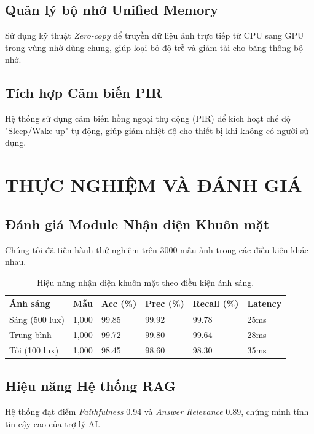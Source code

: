 \documentclass[12pt,a4paper]{article}
\begin{document}
\subsection{Quản lý bộ nhớ Unified Memory}
Sử dụng kỹ thuật \textit{Zero-copy} để truyền dữ liệu ảnh trực tiếp từ CPU sang GPU trong vùng nhớ dùng chung, giúp loại bỏ độ trễ và giảm tải cho băng thông bộ nhớ.

\subsection{Tích hợp Cảm biến PIR}
Hệ thống sử dụng cảm biến hồng ngoại thụ động (PIR) để kích hoạt chế độ "Sleep/Wake-up" tự động, giúp giảm nhiệt độ cho thiết bị khi không có người sử dụng.

\section{THỰC NGHIỆM VÀ ĐÁNH GIÁ}

\subsection{Đánh giá Module Nhận diện Khuôn mặt}
Chúng tôi đã tiến hành thử nghiệm trên 3000 mẫu ảnh trong các điều kiện khác nhau.

\begin{table}[H]
    \centering
    \caption{Hiệu năng nhận diện khuôn mặt theo điều kiện ánh sáng.}
    \begin{tabularx}{\textwidth}{lXXXXX}
        \toprule
        \textbf{Ánh sáng} & \textbf{Mẫu} & \textbf{Acc (\%)} & \textbf{Prec (\%)} & \textbf{Recall (\%)} & \textbf{Latency} \\
        \midrule
        Sáng (500 lux) & 1,000 & 99.85 & 99.92 & 99.78 & 25ms \\
        Trung bình & 1,000 & 99.72 & 99.80 & 99.64 & 28ms \\
        Tối (100 lux) & 1,000 & 98.45 & 98.60 & 98.30 & 35ms \\
        \bottomrule
    \end{tabularx}
\end{table}

\subsection{Hiệu năng Hệ thống RAG}
Hệ thống đạt điểm \textit{Faithfulness} 0.94 và \textit{Answer Relevance} 0.89, chứng minh tính tin cậy cao của trợ lý AI.
\end{document}
